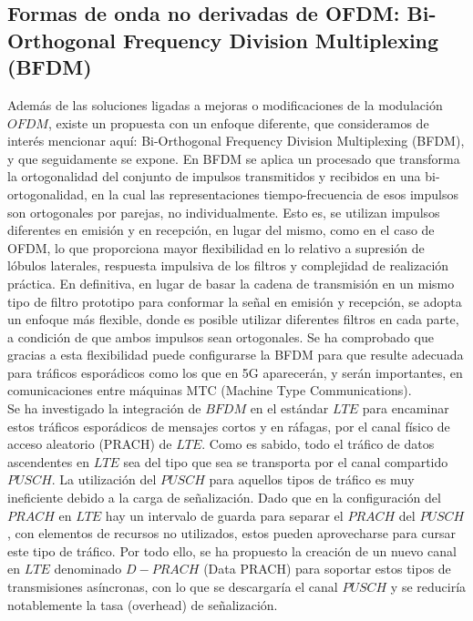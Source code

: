 \documentclass[]{article}
\begin{document}
\subsection{Formas de onda no derivadas de OFDM: Bi-Orthogonal Frequency Division Multiplexing (BFDM) 
	}
	

Además de las soluciones ligadas a mejoras o modificaciones de la modulación $OFDM$, existe un propuesta con un enfoque diferente, que consideramos de interés mencionar aquí: Bi-Orthogonal Frequency Division Multiplexing (BFDM), y que seguidamente se expone. 
En BFDM se aplica un procesado que transforma la ortogonalidad del conjunto de impulsos transmitidos y recibidos en una bi-ortogonalidad, en la cual las representaciones tiempo-frecuencia de esos impulsos son ortogonales por parejas, no individualmente. Esto es, se utilizan impulsos diferentes en emisión y en recepción, en lugar del mismo, como en el caso de OFDM, lo que proporciona mayor flexibilidad en lo relativo a supresión de lóbulos laterales, respuesta impulsiva de los filtros y complejidad de realización práctica. En definitiva, en lugar de basar la cadena de transmisión en un mismo tipo de filtro prototipo para conformar la señal en emisión y recepción, se adopta un enfoque más flexible, donde es posible utilizar diferentes filtros en cada parte, a condición de que ambos impulsos sean ortogonales. Se ha comprobado que gracias a esta flexibilidad puede configurarse la BFDM para que resulte adecuada para tráficos esporádicos como los que en 5G aparecerán, y serán importantes, en comunicaciones entre máquinas MTC (Machine Type Communications).\\

Se ha investigado la integración de $BFDM$ en el estándar $LTE$ para encaminar estos tráficos esporádicos de mensajes cortos y en ráfagas, por el canal físico de acceso aleatorio (PRACH) de $LTE$. Como es sabido, todo el tráfico de datos ascendentes en $LTE$ sea del tipo que sea se transporta por el canal compartido $PUSCH$. La utilización del $PUSCH$ para aquellos tipos de tráfico es muy ineficiente debido a la carga de señalización. Dado que en la configuración del $PRACH$ en $LTE$ hay un intervalo de guarda para separar el $PRACH$ del $PUSCH$, con elementos de recursos no utilizados, estos pueden aprovecharse para cursar este tipo de tráfico.
Por todo ello, se ha propuesto la creación de un nuevo canal en $LTE$ denominado $D-PRACH$ (Data PRACH) para soportar estos tipos de transmisiones asíncronas, con lo que se descargaría el canal $PUSCH$ y se reduciría notablemente la tasa (overhead) de señalización.\\
\end{document}
